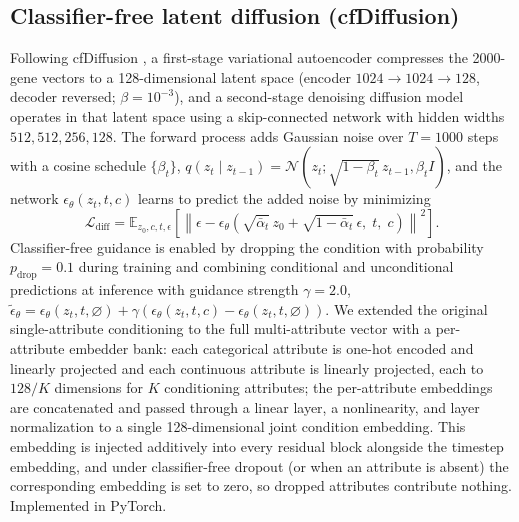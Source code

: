 \documentclass[11pt]{article}
\begin{document}
\subsection{Classifier-free latent diffusion (cfDiffusion)}
Following cfDiffusion \cite{cfdiffusion}, a first-stage variational autoencoder compresses the 2000-gene vectors to a 128-dimensional latent space (encoder $1024\to1024\to128$, decoder reversed; $\beta=10^{-3}$), and a second-stage denoising diffusion model operates in that latent space using a skip-connected network with hidden widths $512,512,256,128$. The forward process adds Gaussian noise over $T=1000$ steps with a cosine schedule $\{\beta_t\}$, $q(z_t\mid z_{t-1})=\mathcal{N}(z_t;\sqrt{1-\beta_t}\,z_{t-1},\beta_t I)$, and the network $\epsilon_\theta(z_t,t,c)$ learns to predict the added noise by minimizing
\begin{equation}
\mathcal{L}_{\mathrm{diff}} = \mathbb{E}_{z_0,c,t,\epsilon}\left[\left\|\epsilon - \epsilon_\theta\!\left(\sqrt{\bar\alpha_t}\,z_0 + \sqrt{1-\bar\alpha_t}\,\epsilon,\; t,\; c\right)\right\|^2\right].
\end{equation}
Classifier-free guidance is enabled by dropping the condition with probability $p_{\mathrm{drop}}=0.1$ during training and combining conditional and unconditional predictions at inference with guidance strength $\gamma=2.0$, $\tilde\epsilon_\theta = \epsilon_\theta(z_t,t,\varnothing) + \gamma\left(\epsilon_\theta(z_t,t,c)-\epsilon_\theta(z_t,t,\varnothing)\right)$. We extended the original single-attribute conditioning to the full multi-attribute vector with a per-attribute embedder bank: each categorical attribute is one-hot encoded and linearly projected and each continuous attribute is linearly projected, each to $128/K$ dimensions for $K$ conditioning attributes; the per-attribute embeddings are concatenated and passed through a linear layer, a nonlinearity, and layer normalization to a single 128-dimensional joint condition embedding. This embedding is injected additively into every residual block alongside the timestep embedding, and under classifier-free dropout (or when an attribute is absent) the corresponding embedding is set to zero, so dropped attributes contribute nothing. Implemented in PyTorch.
\end{document}
